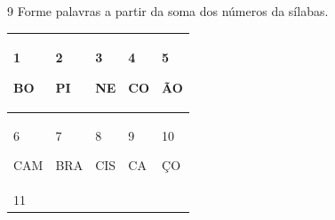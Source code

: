 
\num{9} Forme palavras a partir da soma dos números da sílabas.


\begin{longtable}[]{@{}lllll@{}}
\toprule
\begin{minipage}[b]{0.19\columnwidth}\raggedright\strut
1

BO\strut
\end{minipage} & \begin{minipage}[b]{0.19\columnwidth}\raggedright\strut
2

PI\strut
\end{minipage} & \begin{minipage}[b]{0.19\columnwidth}\raggedright\strut
3

NE\strut
\end{minipage} & \begin{minipage}[b]{0.19\columnwidth}\raggedright\strut
4

CO\strut
\end{minipage} & \begin{minipage}[b]{0.19\columnwidth}\raggedright\strut
5

ÃO\strut
\end{minipage}\tabularnewline
\midrule
\endhead
\begin{minipage}[t]{0.19\columnwidth}\raggedright\strut
6

CAM\strut
\end{minipage} & \begin{minipage}[t]{0.19\columnwidth}\raggedright\strut
7

BRA\strut
\end{minipage} & \begin{minipage}[t]{0.19\columnwidth}\raggedright\strut
8

CIS\strut
\end{minipage} & \begin{minipage}[t]{0.19\columnwidth}\raggedright\strut
9

CA\strut
\end{minipage} & \begin{minipage}[t]{0.19\columnwidth}\raggedright\strut
10

ÇO\strut
\end{minipage}\tabularnewline
\midrule
\begin{minipage}[t]{0.19\columnwidth}\raggedright\strut
11


\end{minipage}
\end{longtable}
